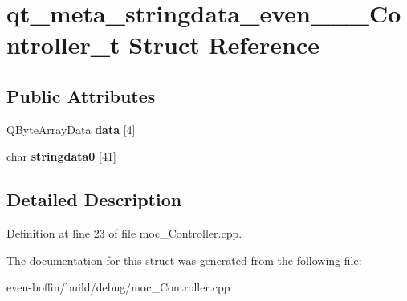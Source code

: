 \hypertarget{structqt__meta__stringdata__even_______controller__t}{}\section{qt\+\_\+meta\+\_\+stringdata\+\_\+even\+\_\+\+\_\+\+\_\+\+Controller\+\_\+t Struct Reference}
\label{structqt__meta__stringdata__even_______controller__t}
\subsection*{Public Attributes}
\begin{DoxyCompactItemize}
\item 
\mbox{\label{structqt__meta__stringdata__even_______controller__t_a39c756748f59ab035d23231d69a5f078}} 
Q\+Byte\+Array\+Data {\bfseries data} \mbox{[}4\mbox{]}
\item 
\mbox{\label{structqt__meta__stringdata__even_______controller__t_ad01003ccbf8bf3299c556d37ca3f16f5}} 
char {\bfseries stringdata0} \mbox{[}41\mbox{]}
\end{DoxyCompactItemize}


\subsection{Detailed Description}


Definition at line 23 of file moc\+\_\+\+Controller.\+cpp.



The documentation for this struct was generated from the following file\+:\begin{DoxyCompactItemize}
\item 
even-\/boffin/build/debug/moc\+\_\+\+Controller.\+cpp\end{DoxyCompactItemize}
